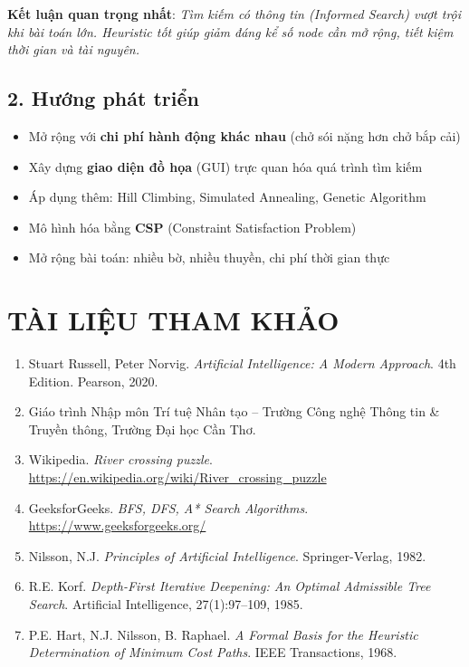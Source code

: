 \documentclass[a4paper,12pt]{article}
\begin{document}
\textbf{Kết luận quan trọng nhất}: \textit{Tìm kiếm có thông tin (Informed Search) vượt trội khi bài toán lớn. Heuristic tốt giúp giảm đáng kể số node cần mở rộng, tiết kiệm thời gian và tài nguyên.}

\subsection*{2. Hướng phát triển}

\begin{itemize}
    \item Mở rộng với \textbf{chi phí hành động khác nhau} (chở sói nặng hơn chở bắp cải)
    \item Xây dựng \textbf{giao diện đồ họa} (GUI) trực quan hóa quá trình tìm kiếm
    \item Áp dụng thêm: Hill Climbing, Simulated Annealing, Genetic Algorithm
    \item Mô hình hóa bằng \textbf{CSP} (Constraint Satisfaction Problem)
    \item Mở rộng bài toán: nhiều bờ, nhiều thuyền, chi phí thời gian thực
\end{itemize}

\section*{TÀI LIỆU THAM KHẢO}

\begin{enumerate}
    \item Stuart Russell, Peter Norvig. \textit{Artificial Intelligence: A Modern Approach}. 4th Edition. Pearson, 2020.

    \item Giáo trình Nhập môn Trí tuệ Nhân tạo -- Trường Công nghệ Thông tin \& Truyền thông, Trường Đại học Cần Thơ.

    \item Wikipedia. \textit{River crossing puzzle}. \url{https://en.wikipedia.org/wiki/River_crossing_puzzle}

    \item GeeksforGeeks. \textit{BFS, DFS, A* Search Algorithms}. \url{https://www.geeksforgeeks.org/}

    \item Nilsson, N.J. \textit{Principles of Artificial Intelligence}. Springer-Verlag, 1982.

    \item R.E. Korf. \textit{Depth-First Iterative Deepening: An Optimal Admissible Tree Search}. Artificial Intelligence, 27(1):97--109, 1985.

    \item P.E. Hart, N.J. Nilsson, B. Raphael. \textit{A Formal Basis for the Heuristic Determination of Minimum Cost Paths}. IEEE Transactions, 1968.
\end{enumerate}
\end{document}
